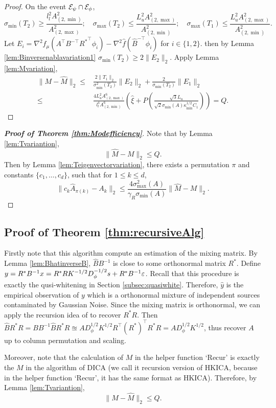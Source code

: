 \begin{proof}
On the event $\mathcal{E}_{\psi}\cap\mathcal{E}_{\phi}$,
\[
\sigma_{\min}(T_2) \ge \frac{l_l^2A^2_{(2,\min)}}{A^2_{(2,\max)}}; \quad \sigma_{\max}(T_2) \le \frac{L_u^2A^2_{(2,\max)}}{A^2_{(2,\min)}};  \quad \sigma_{\max}(T_1) \le \frac{L_u^2A^2_{(2,\max)}}{A^2_{(2,\min)}}. 
\]
Let $E_i = \nabla^2 f_{\mu}(A^{\top}B^{-\top}{R^*}^{\top}\phi_i) - \nabla^2 \hat{f}(\hat{B}^{-\top}\phi_i)$ for  $i\in\{1,2\}$. then by 
Lemma \ref{lem:Binversenablavariation1} $\sigma_{\min}(T_2) \ge 2\|E_2\|_2$.
Apply Lemma \ref{lem:Mvariation},
\begin{align*}
\|M - \hat{M}\|_2 \le &
\frac{2\|T_1\|_2}{\sigma^2_{\min}(T_2)}\|E_2\|_2 + \frac{2}{\sigma_{\min}(T_2)}\|E_1\|_2 \\
\le & \frac{4L_u^2A^6_{(2,\max)}}{l_l^4 A^6_{(2,\min)}}\left(\hat{\xi}
+
P\left(\frac{\sqrt{3}L_u}{\sqrt{2}\sigma_{\min}(A)\kappa_{\min}^{1/2}C_1}\right)\right) = Q.
\end{align*}
\end{proof}
\begin{proof}[{\bf Proof of Theorem \ref{thm:Modefficiency}}]
Note that by Lemma \ref{lem:Tvariantion},
\[
\|\hat{M} - M\|_2 \le Q.
\]
Then by Lemma \ref{lem:Teigenvectorvariation}, there exists a permutation $\pi$ and constants $\{c_1,\ldots,c_d\}$, such that for $1\le k\le d$,
\[
\| c_k\hat{A}_{\pi(k)} - A_k\|_2 \le \frac{4\sigma^2_{\max}(A)}{\gamma_R\sigma_{\min}(A)} \|\hat{M} - M\|_2.
\]
\end{proof}
\subsection{Proof of Theorem \ref{thm:recursiveAlg}}
Firstly note that this algorithm compute an estimation of the mixing matrix. 
By Lemma \ref{lem:BhatinverseB}, $\hat{B}B^{-1}$ is close to some orthonormal matrix $R^*$.
Define $y = R^*B^{-1}x = R^*R K^{-1/2}D_{\phi}^{-1/2}s + R^*B^{-1}\varepsilon$. Recall that this procedure  is exactly the qusi-whitening in Section \ref{subsec:quasiwhite}. Therefore, 
$\hat{y}$ is the empirical observation of $y$ which is a orthonormal mixture of independent sources contaminated by Gaussian Noise. 
Since the mixing matrix is orthonormal, we can apply the recursion idea of \citet{vempala2014max} to recover $R^*R$. 
Then $\hat{B}R^*R= BB^{-1}\hat{B}R^*R \approxeq AD_{\phi}^{1/2}K^{1/2}R^{\top} (R^*)^{\top}R^*R = AD_{\phi}^{1/2}K^{1/2}$, thus recover $A$ up to column permutation and scaling. 

Moreover, note that the calculation of $M$ in the helper function `Recur' is exactly the $M$ in the algorithm of DICA (we call it recursion version of HKICA, because in the helper function `Recur', it has the same format as HKICA).
Therefore, by Lemma \ref{lem:Tvariantion},
\[
\|M-\hat{M}\|_2 \le Q.
\]


